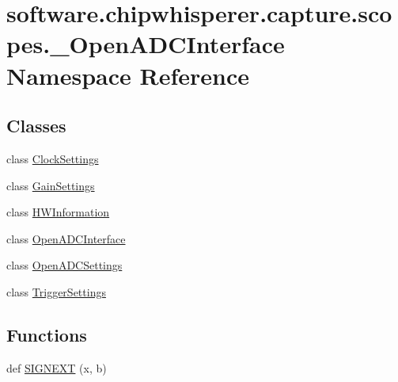 \hypertarget{namespacesoftware_1_1chipwhisperer_1_1capture_1_1scopes_1_1__OpenADCInterface}{}\section{software.\+chipwhisperer.\+capture.\+scopes.\+\_\+\+Open\+A\+D\+C\+Interface Namespace Reference}
\label{namespacesoftware_1_1chipwhisperer_1_1capture_1_1scopes_1_1__OpenADCInterface}
\subsection*{Classes}
\begin{DoxyCompactItemize}
\item 
class \hyperlink{classsoftware_1_1chipwhisperer_1_1capture_1_1scopes_1_1__OpenADCInterface_1_1ClockSettings}{Clock\+Settings}
\item 
class \hyperlink{classsoftware_1_1chipwhisperer_1_1capture_1_1scopes_1_1__OpenADCInterface_1_1GainSettings}{Gain\+Settings}
\item 
class \hyperlink{classsoftware_1_1chipwhisperer_1_1capture_1_1scopes_1_1__OpenADCInterface_1_1HWInformation}{H\+W\+Information}
\item 
class \hyperlink{classsoftware_1_1chipwhisperer_1_1capture_1_1scopes_1_1__OpenADCInterface_1_1OpenADCInterface}{Open\+A\+D\+C\+Interface}
\item 
class \hyperlink{classsoftware_1_1chipwhisperer_1_1capture_1_1scopes_1_1__OpenADCInterface_1_1OpenADCSettings}{Open\+A\+D\+C\+Settings}
\item 
class \hyperlink{classsoftware_1_1chipwhisperer_1_1capture_1_1scopes_1_1__OpenADCInterface_1_1TriggerSettings}{Trigger\+Settings}
\end{DoxyCompactItemize}
\subsection*{Functions}
\begin{DoxyCompactItemize}
\item 
def \hyperlink{namespacesoftware_1_1chipwhisperer_1_1capture_1_1scopes_1_1__OpenADCInterface_a8492be3724e2097930d1a8938d3688d0}{S\+I\+G\+N\+E\+X\+T} (x, b)
\end{DoxyCompactItemize}
